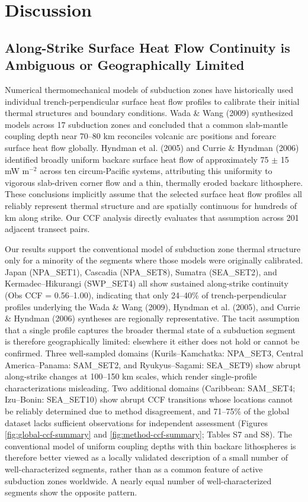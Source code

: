\documentclass[draft,linenumbers]{agujournal2019}
\begin{document}
\section{Discussion}\label{sec:discussion}

\subsection{Along-Strike Surface Heat Flow Continuity is Ambiguous or
Geographically
Limited}\label{sec:along-strike-heat-flow-continuity-is-ambiguous-or-geographically-limited}

Numerical thermomechanical models of subduction zones have historically
used individual trench-perpendicular surface heat flow profiles to
calibrate their initial thermal structures and boundary conditions. Wada
\& Wang (2009) synthesized models across 17 subduction zones and
concluded that a common slab-mantle coupling depth near 70--80 km
reconciles volcanic arc positions and forearc surface heat flow
globally. Hyndman et al. (2005) and Currie \& Hyndman (2006) identified
broadly uniform backarc surface heat flow of approximately 75 \(\pm\) 15
mW m\(^{-2}\) across ten circum-Pacific systems, attributing this
uniformity to vigorous slab-driven corner flow and a thin, thermally
eroded backarc lithosphere. These conclusions implicitly assume that the
selected surface heat flow profiles all reliably represent thermal
structure and are spatially continuous for hundreds of km along strike.
Our CCF analysis directly evaluates that assumption across 201 adjacent
transect pairs.

Our results support the conventional model of subduction zone thermal
structure only for a minority of the segments where those models were
originally calibrated. Japan (NPA\_SET1), Cascadia (NPA\_SET8), Sumatra
(SEA\_SET2), and Kermadec--Hikurangi (SWP\_SET4) all show sustained
along-strike continuity (Obs CCF = 0.56--1.00), indicating that only
24--40\% of trench-perpendicular profiles underlying the Wada \& Wang
(2009), Hyndman et al. (2005), and Currie \& Hyndman (2006) syntheses
are regionally representative. The tacit assumption that a single
profile captures the broader thermal state of a subduction segment is
therefore geographically limited: elsewhere it either does not hold or
cannot be confirmed. Three well-sampled domains (Kurils--Kamchatka:
NPA\_SET3, Central America--Panama: SAM\_SET2, and Ryukyus--Sagami:
SEA\_SET9) show abrupt along-strike changes at 100--150 km scales, which
render single-profile characterizations misleading. Two additional
domains (Caribbean: SAM\_SET4; Izu--Bonin: SEA\_SET10) show abrupt CCF
transitions whose locations cannot be reliably determined due to method
disagreement, and 71--75\% of the global dataset lacks sufficient
observations for independent assessment (Figures
\ref{fig:global-ccf-summary} and \ref{fig:method-ccf-summary}; Tables S7
and S8). The conventional model of uniform coupling depths with thin
backarc lithospheres is therefore better viewed as a locally validated
description of a small number of well-characterized segments, rather
than as a common feature of active subduction zones worldwide. A nearly
equal number of well-characterized segments show the opposite pattern.
\end{document}
